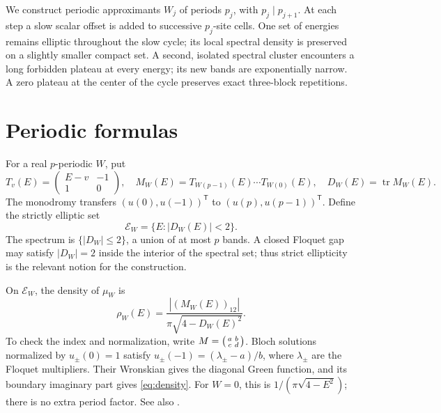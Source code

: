 \documentclass[11pt,a4paper]{article}
\numberwithin{equation}{section}
\theoremstyle{remark}
\newcommand{\tr}{\operatorname{tr}}
\begin{document}
We construct periodic approximants $W_j$ of periods $p_j$, with
$p_j\mid p_{j+1}$. At each step a slow scalar offset is added to
successive $p_j$-site cells. One set of energies remains elliptic
throughout the slow cycle; its local spectral density is preserved
on a slightly smaller compact set. A second, isolated spectral
cluster encounters a long forbidden plateau at every energy; its
new bands are exponentially narrow. A zero plateau at the center
of the cycle preserves exact three-block repetitions.

\section{Periodic formulas}
For a real $p$-periodic $W$, put
\[
T_v(E)=\begin{pmatrix}E-v&-1\\1&0\end{pmatrix},\quad
M_W(E)=T_{W(p-1)}(E)\cdots T_{W(0)}(E),\quad
D_W(E)=\tr M_W(E).
\]
The monodromy transfers $(u(0),u(-1))^{\mathsf T}$ to
$(u(p),u(p-1))^{\mathsf T}$. Define the strictly elliptic set
\[
\mathcal E_W=\{E:|D_W(E)|<2\}.
\]
The spectrum is $\{|D_W|\le2\}$, a union of at most $p$ bands.
A closed Floquet gap may satisfy $|D_W|=2$ inside the interior
of the spectral set; thus strict ellipticity is the relevant
notion for the construction.

On $\mathcal E_W$, the density of $\mu_W$ is
\begin{equation}\label{eq:density}
\rho_W(E)=\frac{|(M_W(E))_{12}|}{\pi\sqrt{4-D_W(E)^2}}.
\end{equation}
To check the index and normalization, write
$M=\begin{psmallmatrix}a&b\\c&d\end{psmallmatrix}$. Bloch solutions
normalized by $u_\pm(0)=1$ satisfy
$u_\pm(-1)=(\lambda_\pm-a)/b$, where $\lambda_\pm$ are the
Floquet multipliers. Their Wronskian gives the diagonal Green
function, and its boundary imaginary part gives \eqref{eq:density}.
For $W=0$, this is $1/(\pi\sqrt{4-E^2})$; there is no extra
period factor. See also \cite[Chapter~7]{Teschl}.
\end{document}
